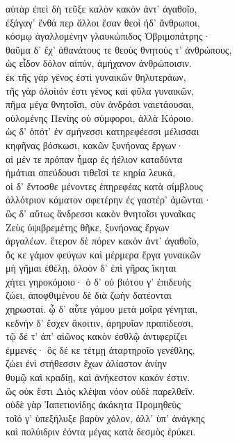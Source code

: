\begin{pages}
\begin{Leftside}
\quad{}αὐτὰρ ἐπεὶ δὴ τεῦξε καλὸν κακὸν ἀντ' ἀγαθοῖο,  \\
ἐξάγαγ' ἔνθά περ ἄλλοι ἔσαν θεοὶ ἠδ' ἄνθρωποι,\\
κόσμῳ ἀγαλλομένην γλαυκώπιδος Ὀβριμοπάτρης· \\
θαῦμα δ' ἔχ' ἀθανάτους τε θεοὺς θνητούς τ' ἀνθρώπους,\\
ὡς εἶδον δόλον αἰπύν, ἀμήχανον ἀνθρώποισιν.\\
ἐκ τῆς γὰρ γένος ἐστὶ γυναικῶν θηλυτεράων, \\
τῆς γὰρ ὀλοίιόν ἐστι γένος καὶ φῦλα γυναικῶν,\\
πῆμα μέγα θνητοῖσι, σὺν ἀνδράσι ναιετάουσαι,\\
οὐλομένης Πενίης οὐ σύμφοροι, ἀλλὰ Κόροιο.\\
ὡς δ' ὁπότ' ἐν σμήνεσσι κατηρεφέεσσι μέλισσαι\\
κηφῆνας βόσκωσι, κακῶν ξυνήονας ἔργων· \\
αἱ μέν τε πρόπαν ἦμαρ ἐς ἠέλιον καταδύντα\\
ἠμάτιαι σπεύδουσι τιθεῖσί τε κηρία λευκά,\\
οἱ δ' ἔντοσθε μένοντες ἐπηρεφέας κατὰ σίμβλους \\
ἀλλότριον κάματον σφετέρην ἐς γαστέρ' ἀμῶνται· \\
ὣς δ' αὔτως ἄνδρεσσι κακὸν θνητοῖσι γυναῖκας \\
Ζεὺς ὑψιβρεμέτης θῆκε, ξυνήονας ἔργων\\
ἀργαλέων. ἕτερον δὲ πόρεν κακὸν ἀντ' ἀγαθοῖο,\\
ὅς κε γάμον φεύγων καὶ μέρμερα ἔργα γυναικῶν\\
μὴ γῆμαι ἐθέλῃ, ὀλοὸν δ' ἐπὶ γῆρας ἵκηται\\
χήτει γηροκόμοιο· ὁ δ' οὐ βιότου γ' ἐπιδευὴς  \\
ζώει, ἀποφθιμένου δὲ διὰ ζωὴν δατέονται\\
χηρωσταί. ᾧ δ' αὖτε γάμου μετὰ μοῖρα γένηται, \\
κεδνὴν δ' ἔσχεν ἄκοιτιν, ἀρηρυῖαν πραπίδεσσι, \\
τῷ δέ τ' ἀπ' αἰῶνος κακὸν ἐσθλῷ ἀντιφερίζει\\
ἐμμενές· ὃς δέ κε τέτμῃ ἀταρτηροῖο γενέθλης,  \\
ζώει ἐνὶ στήθεσσιν ἔχων ἀλίαστον ἀνίην\\
θυμῷ καὶ κραδίῃ, καὶ ἀνήκεστον κακόν ἐστιν.\\

\quad{}ὣς οὐκ ἔστι Διὸς κλέψαι νόον οὐδὲ παρελθεῖν.\\
οὐδὲ γὰρ Ἰαπετιονίδης ἀκάκητα Προμηθεὺς\\
τοῖό γ' ὑπεξήλυξε βαρὺν χόλον, ἀλλ' ὑπ' ἀνάγκης \\
καὶ πολύιδριν ἐόντα μέγας κατὰ δεσμὸς ἐρύκει.\\


\end{Leftside}
\end{pages}
